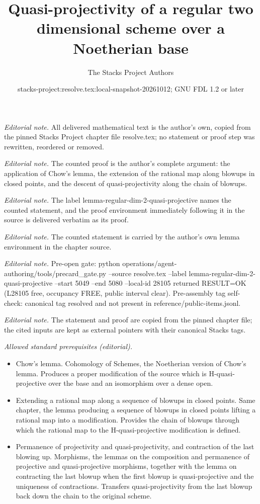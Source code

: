\documentclass[10pt,a4paper]{amsart}
\title{Quasi-projectivity of a regular two dimensional scheme over a Noetherian base}
\author{The Stacks Project Authors}
\date{stacks-project:resolve.tex:local-snapshot-20261012; GNU FDL 1.2 or later}
\theoremstyle{plain}
\theoremstyle{definition}
\theoremstyle{remark}
\numberwithin{equation}{subsection}
\begin{document}
\maketitle
\noindent\textit{Editorial note.} All delivered mathematical text is the author's own, copied from the pinned Stacks Project chapter file resolve.tex; no statement or proof step was rewritten, reordered or removed.\par\medskip
\noindent\textit{Editorial note.} The counted proof is the author's complete argument: the application of Chow's lemma, the extension of the rational map along blowups in closed points, and the descent of quasi-projectivity along the chain of blowups.\par\medskip
\noindent\textit{Editorial note.} The label lemma-regular-dim-2-quasi-projective names the counted statement, and the proof environment immediately following it in the source is delivered verbatim as its proof.\par\medskip
\noindent\textit{Editorial note.} The counted statement is carried by the author's own lemma environment in the chapter source.\par\medskip
\noindent\textit{Editorial note.} Pre-open gate: python operations/agent-authoring/tools/precard\_gate.py --source resolve.tex --label lemma-regular-dim-2-quasi-projective --start 5049 --end 5080 --local-id 28105 returned RESULT=OK (L28105 free, occupancy FREE, public interval clear). Pre-assembly tag self-check: canonical tag resolved and not present in reference/public-items.jsonl.\par\medskip
\noindent\textit{Editorial note.} The statement and proof are copied from the pinned chapter file; the cited inputs are kept as external pointers with their canonical Stacks tags.\par\medskip
\noindent\textit{Allowed standard prerequisites (editorial).}\begin{itemize}
\item Chow's lemma. Cohomology of Schemes, the Noetherian version of Chow's lemma. Produces a proper modification of the source which is H-quasi-projective over the base and an isomorphism over a dense open.
\item Extending a rational map along a sequence of blowups in closed points. Same chapter, the lemma producing a sequence of blowups in closed points lifting a rational map into a modification. Provides the chain of blowups through which the rational map to the H-quasi-projective modification is defined.
\item Permanence of projectivity and quasi-projectivity, and contraction of the last blowing up. Morphisms, the lemmas on the composition and permanence of projective and quasi-projective morphisms, together with the lemma on contracting the last blowup when the first blowup is quasi-projective and the uniqueness of contractions. Transfers quasi-projectivity from the last blowup back down the chain to the original scheme.
\end{itemize}\medskip
\end{document}
